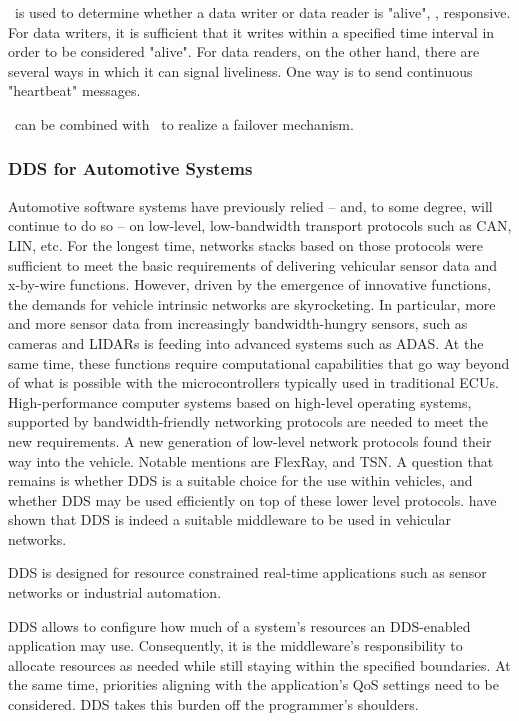 \liveliness\ is used to determine whether a data writer or data reader is "alive", \ie , responsive. For data writers, it is sufficient that it writes within a specified time interval in order to be considered "alive". For data readers, on the other hand, there are several ways in which it can signal liveliness. One way is to send continuous "heartbeat" messages.

\ownership\ can be combined with \liveliness\ to realize a failover mechanism.


\subsubsection{DDS for Automotive Systems}
Automotive software systems have previously relied -- and, to some degree, will continue to do so -- on low-level, low-bandwidth transport protocols such as CAN, LIN, etc. For the longest time, networks stacks based on those protocols were sufficient to meet the basic requirements of delivering vehicular sensor data and x-by-wire functions. However, driven by the emergence of innovative functions, the demands for vehicle intrinsic networks are skyrocketing. In particular, more and more sensor data from increasingly bandwidth-hungry sensors, such as cameras and LIDARs is feeding into advanced systems such as ADAS. At the same time, these functions require computational capabilities that go way beyond of what is possible with the microcontrollers typically used in traditional ECUs. High-performance computer systems based on high-level operating systems, supported by bandwidth-friendly networking protocols are needed to meet the new requirements. A new generation of low-level network protocols found their way into the vehicle. Notable mentions are FlexRay, and TSN. A question that remains is whether DDS is a suitable choice for the use within vehicles, and whether DDS may be used efficiently on top of these lower level protocols. \citeauthor*{bouhouch2013dds} have shown \cite{bouhouch2013dds} that DDS is indeed a suitable middleware to be used in vehicular networks.


DDS is designed for resource constrained real-time applications such as sensor networks or industrial automation.

DDS allows to configure how much of a system's resources an DDS-enabled application may use. Consequently, it is the middleware's responsibility to allocate resources as needed while still staying within the specified boundaries. At the same time, priorities aligning with the application's QoS settings need to be considered. DDS takes this burden off the programmer's shoulders.




